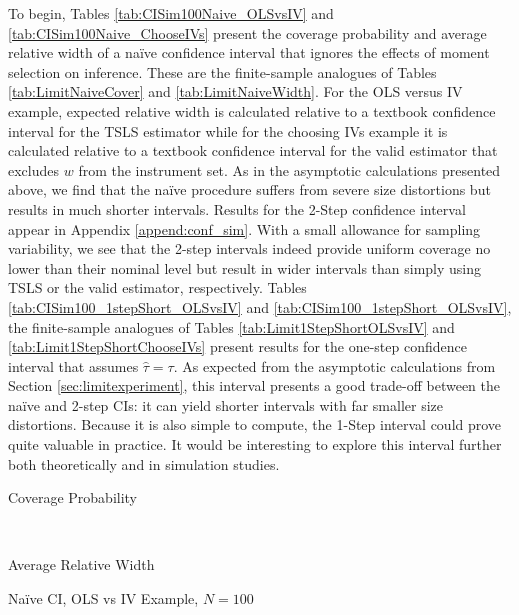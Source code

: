 To begin, Tables \ref{tab:CISim100Naive_OLSvsIV} and \ref{tab:CISim100Naive_ChooseIVs} present the coverage probability and average relative width of a na\"{i}ve confidence interval that ignores the effects of moment selection on inference.
These are the finite-sample analogues of Tables \ref{tab:LimitNaiveCover} and \ref{tab:LimitNaiveWidth}.
For the OLS versus IV example, expected relative width is calculated relative to a textbook confidence interval for the TSLS estimator while for the choosing IVs example it is calculated relative to a textbook confidence interval for the valid estimator that excludes $w$ from the instrument set. 
As in the asymptotic calculations presented above, we find that the na\"{i}ve procedure suffers from severe size distortions but results in much shorter intervals.
Results for the 2-Step confidence interval appear in Appendix \ref{append:conf_sim}.
With a small allowance for sampling variability, we see that the 2-step intervals indeed provide uniform coverage no lower than their nominal level but result in wider intervals than simply using TSLS or the valid estimator, respectively.
Tables \ref{tab:CISim100_1stepShort_OLSvsIV} and \ref{tab:CISim100_1stepShort_OLSvsIV}, the finite-sample analogues of Tables \ref{tab:Limit1StepShortOLSvsIV} and \ref{tab:Limit1StepShortChooseIVs} present results for the one-step confidence interval that assumes $\widehat{\tau} = \tau$.
As expected from the asymptotic calculations from Section \ref{sec:limitexperiment}, this interval presents a good trade-off between the na\"{i}ve and 2-step CIs: it can yield shorter intervals with far smaller size distortions.
Because it is also simple to compute, the 1-Step interval could prove quite valuable in practice.
It would be interesting to explore this interval further both theoretically and in simulation studies.




\begin{table}[h]
  \footnotesize
  \centering
  \begin{subtable}{0.48\textwidth}
    \caption{Coverage Probability}
    
  \end{subtable}
  ~
  \begin{subtable}{0.48\textwidth}
    \caption{Average Relative Width}
    
  \end{subtable}
  \caption{Na\"{i}ve CI, OLS vs IV Example, $N=100$}
  \label{tab:CISim100Naive_OLSvsIV}
\end{table}



